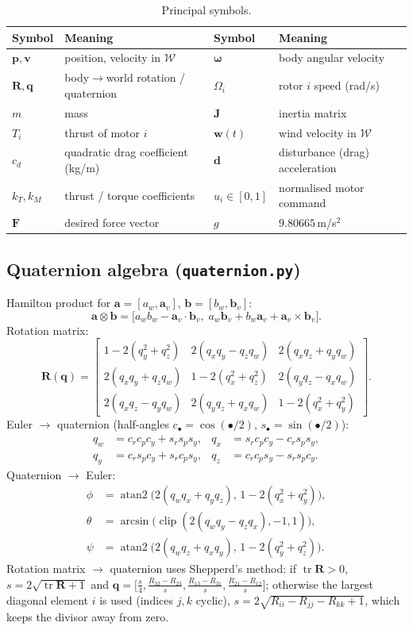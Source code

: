 \documentclass[11pt,a4paper]{article}
\newcommand{\vc}[1]{\bm{#1}}
\newcommand{\code}[1]{\texttt{\small #1}}
\DeclareMathOperator{\clip}{clip}
\DeclareMathOperator{\tr}{tr}
\begin{document}
\begin{table}[h]
\centering\small
\begin{tabular}{@{}ll@{\qquad}ll@{}}
\toprule
Symbol & Meaning & Symbol & Meaning \\ \midrule
$\vc p,\vc v$ & position, velocity in $\mathcal W$ & $\vc\omega$ & body angular velocity \\
$\vc R,\vc q$ & body$\to$world rotation / quaternion & $\Omega_i$ & rotor $i$ speed (rad/s) \\
$m$ & mass & $\vc J$ & inertia matrix \\
$T_i$ & thrust of motor $i$ & $\vc w(t)$ & wind velocity in $\mathcal W$ \\
$c_d$ & quadratic drag coefficient (kg/m) & $\vc d$ & disturbance (drag) acceleration \\
$k_T,k_M$ & thrust / torque coefficients & $u_i\in[0,1]$ & normalised motor command \\
$\vc F$ & desired force vector & $g$ & $9.80665$\,m/s$^2$ \\
\bottomrule
\end{tabular}
\caption{Principal symbols.}
\end{table}

\subsection{Quaternion algebra (\code{quaternion.py})}
Hamilton product for $\vc a=[a_w,\vc a_v]$, $\vc b=[b_w,\vc b_v]$:
\[
\vc a\otimes\vc b=\bigl[a_wb_w-\vc a_v\!\cdot\!\vc b_v,\; a_w\vc b_v+b_w\vc a_v+\vc a_v\times\vc b_v\bigr].
\]
Rotation matrix:
\begin{equation}
\vc R(\vc q)=\begin{bmatrix}
1-2(q_y^2+q_z^2) & 2(q_xq_y-q_zq_w) & 2(q_xq_z+q_yq_w)\\
2(q_xq_y+q_zq_w) & 1-2(q_x^2+q_z^2) & 2(q_yq_z-q_xq_w)\\
2(q_xq_z-q_yq_w) & 2(q_yq_z+q_xq_w) & 1-2(q_x^2+q_y^2)
\end{bmatrix}.
\end{equation}
Euler $\to$ quaternion (half-angles $c_\bullet=\cos(\bullet/2)$, $s_\bullet=\sin(\bullet/2)$):
\begin{align*}
q_w&=c_rc_pc_y+s_rs_ps_y, & q_x&=s_rc_pc_y-c_rs_ps_y,\\
q_y&=c_rs_pc_y+s_rc_ps_y, & q_z&=c_rc_ps_y-s_rs_pc_y.
\end{align*}
Quaternion $\to$ Euler:
\begin{align}
\phi&=\operatorname{atan2}\bigl(2(q_wq_x+q_yq_z),\,1-2(q_x^2+q_y^2)\bigr),\\
\theta&=\arcsin\!\bigl(\clip(2(q_wq_y-q_zq_x),-1,1)\bigr),\\
\psi&=\operatorname{atan2}\bigl(2(q_wq_z+q_xq_y),\,1-2(q_y^2+q_z^2)\bigr).
\end{align}
Rotation matrix $\to$ quaternion uses Shepperd's method: if $\tr\vc R>0$, $s=2\sqrt{\tr\vc R+1}$ and
$\vc q=\bigl[\tfrac s4,\tfrac{R_{32}-R_{23}}{s},\tfrac{R_{13}-R_{31}}{s},\tfrac{R_{21}-R_{12}}{s}\bigr]$; otherwise the largest diagonal element
$i$ is used (indices $j,k$ cyclic), $s=2\sqrt{R_{ii}-R_{jj}-R_{kk}+1}$, which keeps the divisor away from zero.
\end{document}
